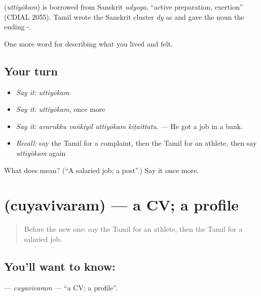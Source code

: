 \begin{cousinweb}
\textbf{} (\emph{uttiyōkam}) is borrowed from Sanskrit \emph{udyoga}, \textquotedblleft{}active preparation, exertion\textquotedblright{} (CDIAL 2055). Tamil wrote the Sanskrit cluster \emph{dy} as  and gave the noun the ending -.
\end{cousinweb}

\begin{grammarlens}[title={What you've built}]
One more word for describing what you lived and felt.
\end{grammarlens}

\subsection*{Your turn}
\begin{itemize}
\raggedright
  \item \emph{Say it:} \emph{uttiyōkam}
  \item \emph{Say it:} \emph{uttiyōkam}, once more
  \item \emph{Say it:} \emph{avarukku vaṅkiyil uttiyōkam kiṭaittatu.} — He got a job in a bank.
  \item \emph{Recall:} say the Tamil for a complaint, then the Tamil for an athlete, then say \emph{uttiyōkam} again
\end{itemize}

\begin{tcolorbox}[breakable,colback=teal!4,colframe=teal!35!black,title={Before you move on}]
What does  mean? (\textquotedblleft{}A salaried job; a post\textquotedblright{}.) Say it once more.
\end{tcolorbox}
\section[\texorpdfstring{\ta{சுயவிவரம்} (cuyavivaram)}{சுயவிவரம் (cuyavivaram)}]{ (cuyavivaram) — a CV; a profile}

\label{lesson:TA-C506-cuyavivaram}



\begin{quote}
Before the new one: say the Tamil for an athlete, then the Tamil for a salaried job.
\end{quote}

\subsection*{You'll want to know: }
\textbf{} — \emph{cuyavivaram} — \textquotedblleft{}a CV; a profile\textquotedblright{}.


